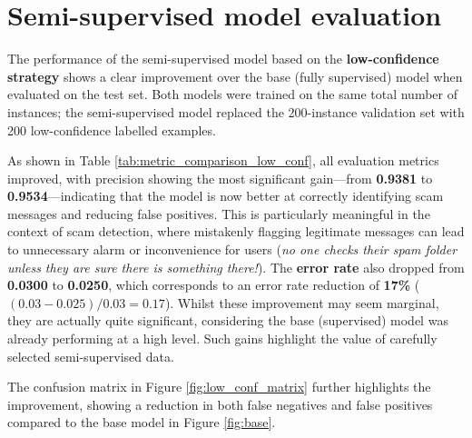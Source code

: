 \documentclass[a4paper,12pt]{article}
\begin{document}
\section{Semi-supervised model evaluation}

The performance of the semi-supervised model based on the \textbf{low-confidence strategy} shows a clear improvement over the base (fully supervised) model when evaluated on the test set. Both models were trained on the same total number of instances; the semi-supervised model replaced the 200-instance validation set with 200 low-confidence labelled examples.

As shown in Table \ref{tab:metric_comparison_low_conf}, all evaluation metrics improved, with precision showing the most significant gain—from \textbf{0.9381} to \textbf{0.9534}—indicating that the model is now better at correctly identifying scam messages and reducing false positives. This is particularly meaningful in the context of scam detection, where mistakenly flagging legitimate messages can lead to unnecessary alarm or inconvenience for users (\textit{no one checks their spam folder unless they are sure there is something there!}). The \textbf{error rate} also dropped from \textbf{0.0300} to \textbf{0.0250}, which corresponds to an error rate reduction of \textbf{17\%} ($(0.03 - 0.025)/0.03 = 0.17$). Whilst these improvement may seem marginal, they are actually quite significant, considering the base (supervised) model was already performing at a high level. Such gains highlight the value of carefully selected semi-supervised data. 

The confusion matrix in Figure \ref{fig:low_conf_matrix} further highlights the improvement, showing a  reduction in both false negatives and false positives compared to the base model in Figure \ref{fig:base}.
\end{document}
